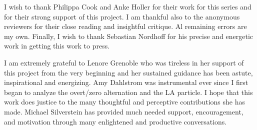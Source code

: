 \begin{refsection}

I wish to thank Philippa Cook and Anke Holler for their work for this series and for their strong support of this project. I am thankful also to the anonymous reviewers for their close reading and insightful critique. Al remaining errors are my own. Finally, I wish to thank Sebastian Nordhoff for his precise and energetic work in getting this work to press.

I am extremely grateful to Lenore Grenoble who was tireless in her support of this project from the very beginning and her sustained guidance has been astute, inspirational and energizing. Amy Dahlstrom was instrumental ever since I first began to analyze the overt/zero  alternation and the LA particle. I hope that this work does justice to the many thoughtful and perceptive contributions she has made. Michael Silverstein has provided much needed support, encouragement, and motivation through many enlightened and productive conversations.



\end{refsection}
